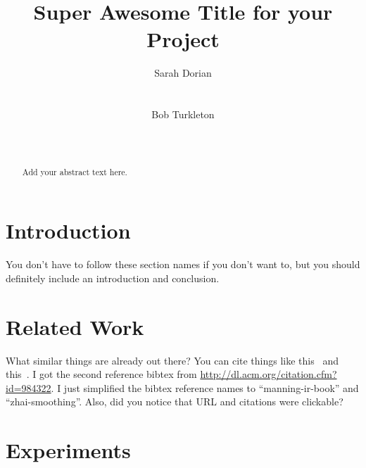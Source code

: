 \documentclass{acm} %
\begin{document}
\sloppy %

\title{Super Awesome Title for your Project
}

\author{%
    \alignauthor Sarah Dorian \\
    \\
    \\
    \alignauthor Bob Turkleton\\
    \\
    \\
}
\maketitle

\begin{abstract}
Add your abstract text here.
\end{abstract}


\section{Introduction}

You don't have to follow these section names if you don't want to, but you
should definitely include an introduction and conclusion.

\section{Related Work}

What similar things are already out there? You can cite things like
this~\cite{manning-ir-book} and this~\cite{zhai-smoothing}. I got the second
reference bibtex from \url{http://dl.acm.org/citation.cfm?id=984322}. I just
simplified the bibtex reference names to ``manning-ir-book'' and
``zhai-smoothing''. Also, did you notice that URL and citations were clickable?

\section{Experiments}
\end{document}
